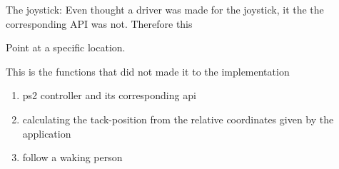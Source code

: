 The joystick: Even thought a driver was made for the joystick, it the the corresponding API was not. Therefore this 

Point at a specific location. 

This is the functions that did not made it to the implementation

\begin{enumerate}[noitemsep]
	
	\item ps2 controller and its corresponding api
	
	\item calculating the tack-position from the relative coordinates given by the application  
	
	\item follow a waking person
	

\end{enumerate}






